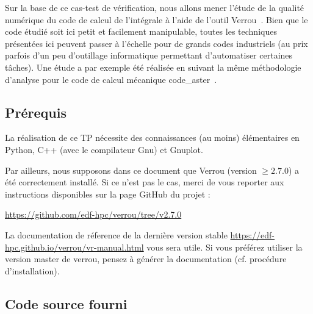 \documentclass[a4paper]{article}
\begin{document}
\bigskip

Sur la base de ce cas-test de vérification, nous allons mener l'étude de la
qualité numérique du code de calcul de l'intégrale à l'aide de l'outil
Verrou~\cite{verrou, verrou-hpc}. Bien que le code étudié soit ici petit et facilement
manipulable, toutes les techniques présentées ici peuvent passer à l'échelle
pour de grands codes industriels (au prix parfois d'un peu d'outillage
informatique permettant d'automatiser certaines tâches). Une étude a par exemple
été réalisée en suivant la même méthodologie d'analyse pour le code de calcul
mécanique code\_aster~\cite{fevotte2017}.

\subsection*{Prérequis}

La réalisation de ce TP nécessite des connaissances (au moins) élémentaires en
Python, C++ (avec le compilateur Gnu) et Gnuplot.

\medskip

Par ailleurs, nous supposons dans ce document que Verrou (version
$\geqslant 2.7.0$) a été correctement installé. Si ce n'est pas le cas, merci de
vous reporter aux instructions disponibles sur la page GitHub du projet :
\begin{center}
  \url{https://github.com/edf-hpc/verrou/tree/v2.7.0}
\end{center}

La documentation de réference de la dernière version stable \url{https://edf-hpc.github.io/verrou/vr-manual.html}
vous sera utile. Si vous préférez utiliser la version master de verrou, pensez à générer la documentation (cf. procédure d'installation).



\subsection*{Code source fourni}
\end{document}
